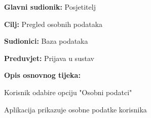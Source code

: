 					\noindent {}
					\begin{packed_item}
						
						\item \textbf{Glavni sudionik: } Posjetitelj
						\item  \textbf{Cilj:}  Pregled osobnih podataka
						\item  \textbf{Sudionici:}  Baza podataka
						\item  \textbf{Preduvjet:}  Prijava u sustav
						\item  \textbf{Opis osnovnog tijeka:}
						
						\item[] \begin{packed_enum}
							
							\item  Korisnik odabire opciju "Osobni podatci"
							\item  Aplikacija prikazuje osobne podatke korisnika						
						\end{packed_enum}
					\end{packed_item}
				
